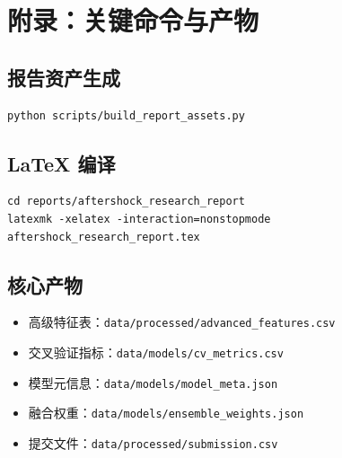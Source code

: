 \documentclass[UTF8,a4paper,12pt]{ctexrep}
\begin{document}
\appendix
\chapter{附录：关键命令与产物}

\section{报告资产生成}
\begin{lstlisting}[style=bashcode,caption={生成报告图表与表格}]
python scripts/build_report_assets.py
\end{lstlisting}

\section{LaTeX 编译}
\begin{lstlisting}[style=bashcode,caption={编译研究报告}]
cd reports/aftershock_research_report
latexmk -xelatex -interaction=nonstopmode aftershock_research_report.tex
\end{lstlisting}

\section{核心产物}
\begin{itemize}
  \item 高级特征表：\texttt{data/processed/advanced\_features.csv}
  \item 交叉验证指标：\texttt{data/models/cv\_metrics.csv}
  \item 模型元信息：\texttt{data/models/model\_meta.json}
  \item 融合权重：\texttt{data/models/ensemble\_weights.json}
  \item 提交文件：\texttt{data/processed/submission.csv}
\end{itemize}
\end{document}
